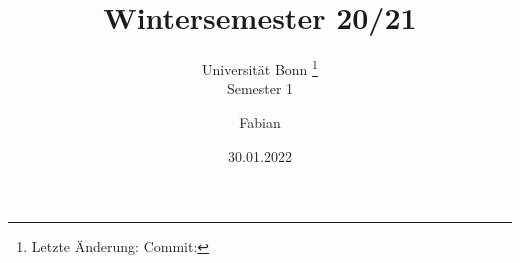 \documentclass[a4paper, 10pt, oneside, openany,  bibliography=totocnumbered]{scrbook}
\begin{document}
\subject{Vorlesungsmitschriften}
\title{Wintersemester 20/21}
\subtitle{
  Universität Bonn \footnote{
    Letzte Änderung: \texttt{\gitAuthorDate}
    \hfill
    Commit: \texttt{\gitAbbrevHash}
  }
  \\
  Semester 1
}
\author{Fabian}
\date{30.01.2022}
\publishers{
  Online aufrufbar auf \texttt{\url{https://github.com/git-fabus/lecutres/blob/main/notes.pdf}.}
  \\
  Veränderungsvorschläge und Verbesserungen bitte an \texttt{\href{mailto:git-fabus@uni-bonn.de}{git-fabus@uni-bonn.de}.}
}

\frontmatter
\maketitle

\tableofcontents

\mainmatter


\appendix %
%

\backmatter
%
\end{document}
